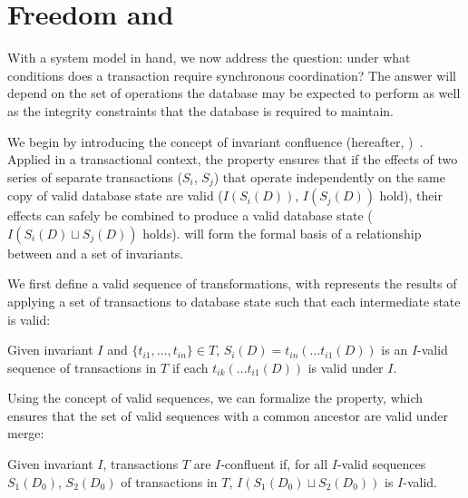 
\section{Freedom and \iconfluence}
\label{sec:bcc-theory}

With a system model in hand, we now address the question: under what
conditions does a transaction require synchronous coordination? The
answer will depend on the set of operations the database may be
expected to perform as well as the integrity constraints that the
database is required to maintain.

We begin by introducing the concept of invariant confluence
(hereafter, \iconfluence)~\cite{obs-confluence}. Applied in a
transactional context, the \iconfluence property ensures that if the
effects of two series of separate transactions ($S_i$, $S_j$) that
operate independently on the same copy of valid database state are
valid ($I(S_i(D))$, $I(S_j(D))$ hold), their effects can safely be
combined to produce a valid database state ($I(S_i(D) \sqcup S_j(D))$
holds). \iconfluence will form the formal basis of a relationship
between \cfreedom and a set of invariants.

We first define a valid sequence of transformations, with represents
the results of applying a set of transactions to database state such
that each intermediate state is valid:

\begin{definition}
Given invariant $I$ and $\{t_{i1}, \dots, t_{in}\} \in T$, $S_i(D) =
t_{in}(\dots t_{i1}(D))$ is an $I$-valid sequence of transactions in
$T$ if each $t_{ik}(\dots t_{i1}(D))$ is valid under $I$.
\end{definition}

Using the concept of valid sequences, we can formalize the
\iconfluence property, which ensures that the set of valid sequences
with a common ancestor are valid under merge:

\begin{definition}[\iconfluence]
Given invariant $I$, transactions $T$ are $I$-confluent if, for all
$I$-valid sequences $S_1(D_0)$, $S_2(D_0)$ of transactions in $T$,
$I(S_1(D_0) \sqcup S_2(D_0))$ is $I$-valid.
\end{definition}

